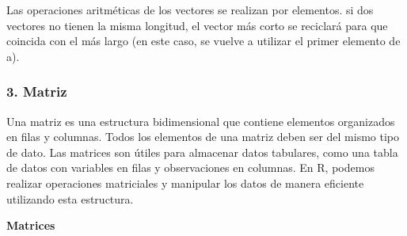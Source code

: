 \documentclass[
  jou,
  floatsintext,
  longtable,
  a4paper,
  nolmodern,
  notxfonts,
  notimes,
  12pt,
  colorlinks=true,linkcolor=blue,citecolor=blue,urlcolor=blue]{apa7}
\begin{document}
\begin{tcolorbox}[enhanced jigsaw, arc=.35mm, bottomrule=.15mm, bottomtitle=1mm, breakable, colback=white, colbacktitle=quarto-callout-note-color!10!white, colframe=quarto-callout-note-color-frame, coltitle=black, left=2mm, leftrule=.75mm, opacityback=0, opacitybacktitle=0.6, rightrule=.15mm, title=\textcolor{quarto-callout-note-color}{\faInfo}\hspace{0.5em}{Nota}, titlerule=0mm, toprule=.15mm, toptitle=1mm]

Las operaciones aritméticas de los vectores se realizan por elementos.
si dos vectores no tienen la misma longitud, el vector más corto se
reciclará para que coincida con el más largo (en este caso, se vuelve a
utilizar el primer elemento de a).

\end{tcolorbox}

\subsubsection{3. Matriz}\label{matriz}

Una matriz es una estructura bidimensional que contiene elementos
organizados en filas y columnas. Todos los elementos de una matriz deben
ser del mismo tipo de dato. Las matrices son útiles para almacenar datos
tabulares, como una tabla de datos con variables en filas y
observaciones en columnas. En R, podemos realizar operaciones
matriciales y manipular los datos de manera eficiente utilizando esta
estructura.

\textbf{Matrices}
\end{document}
